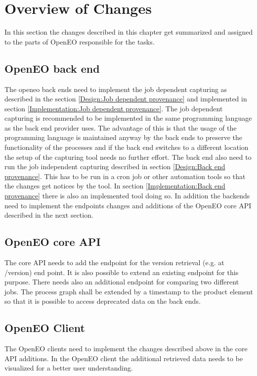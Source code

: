 \documentclass[draft,final]{vutinfth} %
\begin{document}
\section{Overview of Changes}\label{Design:Overview of Changes}
In this section the changes described in this chapter get summarized and assigned to the parts of OpenEO responsible for the tasks.
\subsection{OpenEO back end}\label{Design:OpenEO back end}
The openeo back ends need to implement the job dependent capturing as described in the section \ref{Design:Job dependent provenance} and implemented in section \ref{Implementation:Job dependent provenance}. The job dependent capturing is recommended to be implemented in the same programming language as the back end provider uses. The advantage of this is that the usage of the programming language is maintained anyway by the back ends to preserve the functionality of the processes and if the back end switches to a different location the setup of the capturing tool needs no further effort. 
The back end also need to run the job independent capturing described in section \ref{Design:Back end provenance}. This has to be run in a cron job or other automation tools so that the changes get notices by the tool. In section \ref{Implementation:Back end provenance} there is also an implemented tool doing so. 
In addition the backends need to implement the endpoints changes and additions of the OpenEO core API described in the next section.
\subsection{OpenEO core API}\label{Design:OpenEO core API}
The core API needs to add the endpoint for the version retrieval (e.g. at /version) end point. It is also possible to extend an existing endpoint for this purpose. 
There needs also an additional endpoint for comparing two different jobs. 
The process graph shall be extended by a timestamp to the product element so that it is possible to access deprecated data on the back ends.
\subsection{OpenEO Client}\label{Design:OpenEO Client}
The OpenEO clients need to implement the changes described above in the core API additions. In the OpenEO client the additional retrieved data needs to be visualized for a better user understanding.
\end{document}
